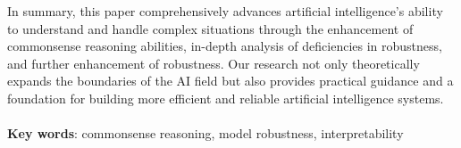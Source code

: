 \documentclass[UTF8,a4paper,12pt]{ctexart}
\numberwithin{equation}{section}
\begin{document}
In summary, this paper comprehensively advances artificial intelligence's ability to understand and handle complex situations through the enhancement of commonsense reasoning abilities, in-depth analysis of deficiencies in robustness, and further enhancement of robustness. Our research not only theoretically expands the boundaries of the AI field but also provides practical guidance and a foundation for building more efficient and reliable artificial intelligence systems.
\\
~\\ 
\textbf{Key words}: commonsense reasoning, model robustness, interpretability

\newpage
\renewcommand\contentsname{\textbf{目\quad 录}}
\begin{center}
{\tableofcontents
\thispagestyle{fancy}



}
\end{center}

\newpage
{}
\setcounter{figure}{0}
\setcounter{table}{0}


\newpage
{}
\setcounter{figure}{0}
\setcounter{table}{0}


\newpage
{}
\setcounter{figure}{0}
\setcounter{table}{0}


\newpage
{}
\setcounter{figure}{0}
\setcounter{table}{0}


\newpage
{}
\setcounter{figure}{0}
\setcounter{table}{0}

\end{document}
